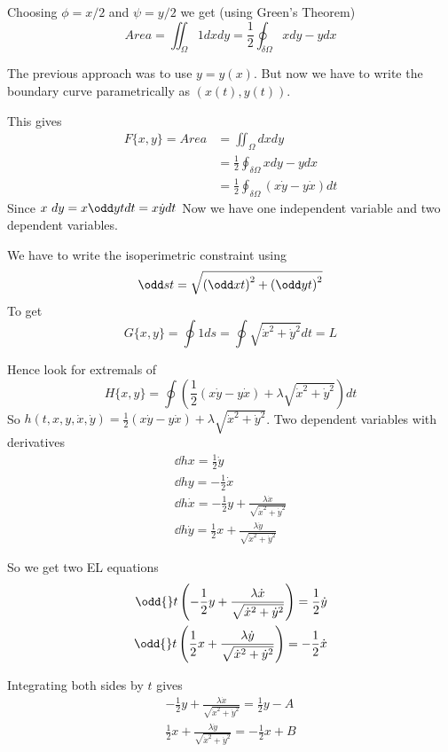 \documentclass{X:/Documents/Coding/Latex/myassignment}
\begin{document}
Choosing $\phi = x/2$ and $\psi = y/2$ we get (using Green's Theorem)
\[Area = \iint_{\Omega} 1 dxdy = \frac12 \oint_{\delta\Omega} xdy - ydx\]

The previous approach was to use $y = y(x)$. But now we have to write the boundary curve parametrically as $(x(t),y(t))$.

This gives
\begin{align*}
	F\{x,y\} = Area &= \iint_{\Omega} dxdy\\
	&= \frac12 \oint_{\delta\Omega} xdy - ydx\\
	&= \frac12 \oint_{\delta\Omega} (x\dot y - y \dot x) dt
\end{align*}
Since $x\ dy = x\odd yt dt = x\dot y dt$
Now we have one independent variable and two dependent variables.

We have to write the isoperimetric constraint using
\[\odd st = \sqrt{\left(\odd xt\right)^2 + \left(\odd yt\right)^2}\]
To get
\[G\{x,y\} = \oint 1 ds = \oint \sqrt{\dot x^2 + \dot y ^2} dt = L\]


Hence look for extremals of
\[H\{x,y\} = \oint \left(\frac12 (x\dot y - y\dot x) + \lambda \sqrt{\dot x ^2 + \dot y^2}\right) dt\]
So $h(t,x,y,\dot x,\dot y) = \frac12 (x\dot y - y\dot x) + \lambda \sqrt{\dot x ^2 + \dot y^2}$. Two dependent variables with derivatives
\begin{align*}
	\dd hx = \frac12 \dot y\\
	\dd hy = -\frac12 \dot x\\
	\dd h{\dot x} = -\frac12 y + \frac{\lambda \dot x}{\sqrt{\dot x^2 + \dot y^2}}\\
	\dd h{\dot y} = \frac12 x + \frac{\lambda \dot y}{\sqrt{\dot x^2 + \dot y^2}}
\end{align*}

So we get two EL equations
\begin{align*}
	\odd{}t \left(-\frac12 y + \frac{\lambda \dot x}{\sqrt{\dot x^2 + \dot y^2}}\right) = \frac12 \dot y\\
	\odd{}t \left(\frac12 x + \frac{\lambda \dot y}{\sqrt{\dot x^2 + \dot y^2}}\right) = -\frac12 \dot x\\
\end{align*}

Integrating both sides by $t$ gives
\begin{align*}
	-\frac12 y + \frac{\lambda \dot x}{\sqrt{\dot x^2 + \dot y^2}} = \frac12 y - A\\
	\frac12 x + \frac{\lambda \dot y}{\sqrt{\dot x^2 + \dot y^2}} = -\frac12 x + B
\end{align*}
\end{document}
